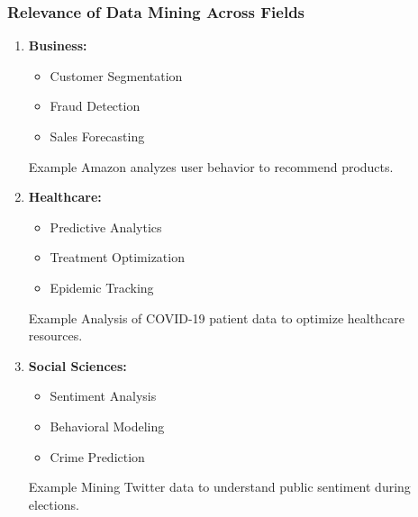 \documentclass[aspectratio=169]{beamer}
\begin{document}
\begin{frame}[fragile]
    \frametitle{Relevance of Data Mining Across Fields}
    
    \begin{enumerate}
        \item \textbf{Business:}
            \begin{itemize}
                \item Customer Segmentation
                \item Fraud Detection
                \item Sales Forecasting
            \end{itemize}
            \begin{block}{Example}
                Amazon analyzes user behavior to recommend products.
            \end{block}
        
        \item \textbf{Healthcare:}
            \begin{itemize}
                \item Predictive Analytics
                \item Treatment Optimization
                \item Epidemic Tracking
            \end{itemize}
            \begin{block}{Example}
                Analysis of COVID-19 patient data to optimize healthcare resources.
            \end{block}

        \item \textbf{Social Sciences:}
            \begin{itemize}
                \item Sentiment Analysis
                \item Behavioral Modeling
                \item Crime Prediction
            \end{itemize}
            \begin{block}{Example}
                Mining Twitter data to understand public sentiment during elections.
            \end{block}
    \end{enumerate}
\end{frame}
\end{document}
